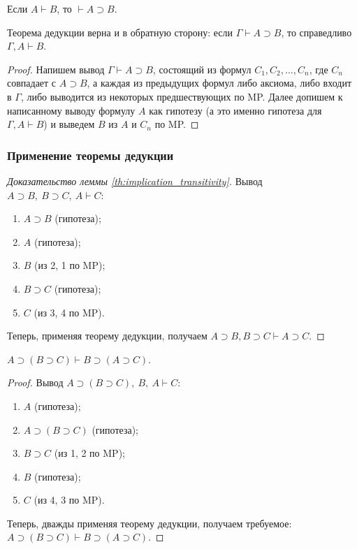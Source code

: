 \begin{corollary*}
    Если $A \vdash B$, то $\vdash A \supset B$.
\end{corollary*}

\begin{remark*}
    Теорема дедукции верна и в обратную сторону: если $\Gamma \vdash A \supset B$, то справедливо $\Gamma, A \vdash B$.
\end{remark*}
\begin{proof}
    Напишем вывод $\Gamma \vdash A \supset B$, состоящий из формул $C_1, C_2, \dots, C_n$, где $C_n$ совпадает с $A \supset B$, а каждая из предыдущих формул либо аксиома, либо входит в $\Gamma$, либо выводится из некоторых предшествующих по MP. Далее допишем к написанному выводу формулу $A$ как гипотезу (а это именно гипотеза для $\Gamma, A \vdash B$) и выведем $B$ из $A$ и $C_n$ по MP.
\end{proof}

\subsubsection{Применение теоремы дедукции}
\begin{proof}[Доказательство леммы \ref{th:implication_transitivity}]\leavevmode
    
    Вывод $A \supset B,\ B \supset C,\ A \vdash C$:
    \begin{enumerate}
        \item $A \supset B$ (гипотеза);
        \item $A$ (гипотеза);
        \item $B$ (из 2, 1 по MP);
        \item $B \supset C$ (гипотеза);
        \item $C$ (из 3, 4 по MP).
    \end{enumerate}
    Теперь, применяя теорему дедукции, получаем $A \supset B, B \supset C \vdash A \supset C$.
\end{proof}

\begin{lemma}
    $A \supset (B \supset C) \vdash B \supset (A \supset C)$.
\end{lemma}
\begin{proof}\leavevmode

    Вывод $A \supset (B \supset C),\ B,\ A \vdash C$:
    \begin{enumerate}
        \item $A$ (гипотеза);
        \item $A \supset (B \supset C)$ (гипотеза);
        \item $B \supset C$ (из 1, 2 по MP);
        \item $B$ (гипотеза);
        \item $C$ (из 4, 3 по MP).
    \end{enumerate}
    Теперь, дважды применяя теорему дедукции, получаем требуемое: $A \supset (B \supset C) \vdash B \supset (A \supset C)$.
\end{proof}

